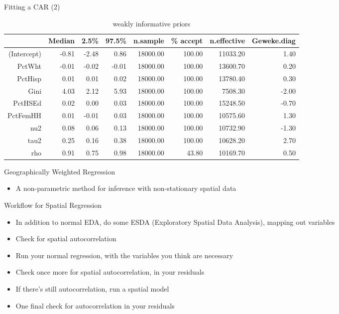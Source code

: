 \documentclass[aspectratio = 169, 12pt]{beamer}\usepackage[]{graphicx}\usepackage[]{color}
\begin{document}
\begin{frame}{Fitting a CAR (2)}
\begin{table}[ht]
\centering
\begin{tabular}{rrrrrrrr}
  \hline
 & Median & 2.5\% & 97.5\% & n.sample & \% accept & n.effective & Geweke.diag \\ 
  \hline
(Intercept) & -0.81 & -2.48 & 0.86 & 18000.00 & 100.00 & 11033.20 & 1.40 \\ 
  PctWht & -0.01 & -0.02 & -0.01 & 18000.00 & 100.00 & 13600.70 & 0.20 \\ 
  PctHisp & 0.01 & 0.01 & 0.02 & 18000.00 & 100.00 & 13780.40 & 0.30 \\ 
  Gini & 4.03 & 2.12 & 5.93 & 18000.00 & 100.00 & 7508.30 & -2.00 \\ 
  PctHSEd & 0.02 & 0.00 & 0.03 & 18000.00 & 100.00 & 15248.50 & -0.70 \\ 
  PctFemHH & 0.01 & -0.01 & 0.03 & 18000.00 & 100.00 & 10575.60 & 1.30 \\ 
  nu2 & 0.08 & 0.06 & 0.13 & 18000.00 & 100.00 & 10732.90 & -1.30 \\ 
  tau2 & 0.25 & 0.16 & 0.38 & 18000.00 & 100.00 & 10628.20 & 2.70 \\ 
  rho & 0.91 & 0.75 & 0.98 & 18000.00 & 43.80 & 10169.70 & 0.50 \\ 
   \hline
\end{tabular}
\caption{weakly informative priors} 
\end{table}

\end{frame}

\begin{frame}{Geographically Weighted Regression}
\begin{itemize}
\item A non-parametric method for inference with non-stationary spatial data
\end{itemize}
\end{frame}

\begin{frame}{Workflow for Spatial Regression}
\begin{itemize}
\item In addition to normal EDA, do some ESDA (Exploratory Spatial Data Analysis), mapping out variables
\item Check for spatial autocorrelation
\item Run your normal regression, with the variables you think are necessary
\item Check once more for spatial autocorrelation, in your residuals
\item If there's still autocorrelation, run a spatial model
\item One final check for autocorrelation in your residuals
\end{itemize}
\end{frame}
\end{document}
